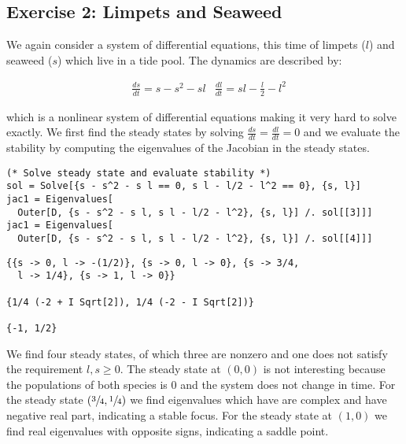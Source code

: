 \documentclass[11pt,a4paper,onecolumn]{article}
\begin{document}
\begin{figure}[H]
  \centering
\end{figure}

\subsection{Exercise 2: Limpets and Seaweed}
We again consider a system of differential equations, this time of limpets ($l$) and seaweed ($s$) which live in a tide pool. The dynamics are described by:

\begin{align*}
  &\frac{ds}{dt} = s - s^2 - sl \nonumber
  &\frac{dl}{dt} = sl - \frac{l}{2} - l^2
\end{align*}

which is a nonlinear system of differential equations making it very hard to solve exactly. We first find the steady states by solving $\frac{ds}{dt} = \frac{dl}{dt} = 0$ and we evaluate the stability by computing the eigenvalues of the Jacobian in the steady states.

\begin{lstlisting}[mathescape]
(* Solve steady state and evaluate stability *)
sol = Solve[{s - s^2 - s l == 0, s l - l/2 - l^2 == 0}, {s, l}]
jac1 = Eigenvalues[
  Outer[D, {s - s^2 - s l, s l - l/2 - l^2}, {s, l}] /. sol[[3]]]
jac1 = Eigenvalues[
  Outer[D, {s - s^2 - s l, s l - l/2 - l^2}, {s, l}] /. sol[[4]]]
\end{lstlisting}

\begin{lstlisting}[mathescape]
{{s -> 0, l -> -(1/2)}, {s -> 0, l -> 0}, {s -> 3/4, 
  l -> 1/4}, {s -> 1, l -> 0}}

{1/4 (-2 + I Sqrt[2]), 1/4 (-2 - I Sqrt[2])}

{-1, 1/2}
\end{lstlisting}

We find four steady states, of which three are nonzero and one does not satisfy the requirement $l,s \geq 0$. The steady state at $(0,0)$ is not interesting because the populations of both species is 0 and the system does not change in time. For the steady state $(\sfrac{3}{4},\sfrac{1}{4})$ we find eigenvalues which have are complex and have negative real part, indicating a stable focus. For the steady state at $(1,0)$ we find real eigenvalues with opposite signs, indicating a saddle point.
\end{document}
